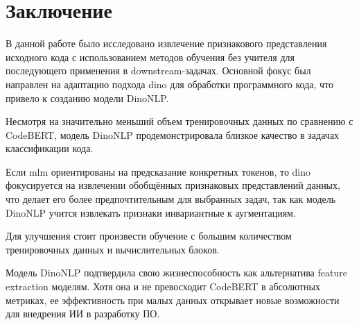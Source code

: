 \documentclass[../document.tex]{subfiles}
\begin{document}
\section{Заключение}
\par В данной работе было исследовано извлечение признакового представления исходного кода с использованием методов обучения без учителя для последующего применения в downstream-задачах. Основной фокус был направлен на адаптацию подхода \acrshort{dino} для обработки программного кода, что привело к созданию модели DinoNLP.
\par Несмотря на значительно меньший объем тренировочных данных по сравнению с CodeBERT, модель DinoNLP продемонстрировала близкое качество в задачах классификации кода.
\par Если \acrshort{mlm} ориентированы на предсказание конкретных токенов, то \acrshort{dino} фокусируется на извлечении обобщённых признаковых представлений данных, что делает его более предпочтительным для выбранных задач, так как модель DinoNLP учится извлекать признаки инвариантные к аугментациям.
\par Для улучшения стоит произвести обучение с большим количеством тренировочных данных и вычислительных блоков.
\par Модель DinoNLP подтвердила свою жизнеспособность как альтернатива feature extraction моделям. Хотя она и не превосходит CodeBERT в абсолютных метриках, ее эффективность при малых данных открывает новые возможности для внедрения ИИ в разработку ПО.
\end{document}
